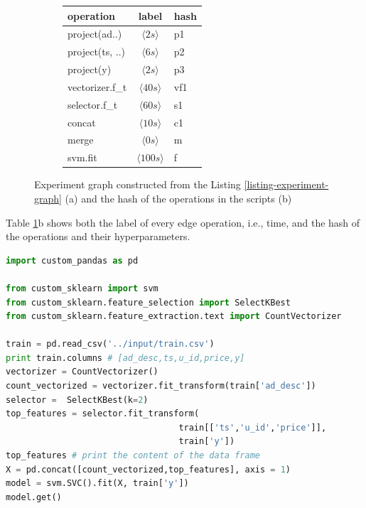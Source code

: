 \begin{figure}
\begin{subfigure}[b]{0.6\linewidth}
\begin{tabular}{lcl}
\hline
operation & label &  hash \\
\hline
project(ad..) & $\langle 2s\rangle$ &p1 \\
project(ts, ..) & $\langle 6s\rangle$ & p2\\
project(y) & $\langle 2s\rangle$ & p3\\
vectorizer.f\_t & $\langle 40s\rangle$ & vf1 \\
selector.f\_t & $\langle 60s\rangle$ & s1 \\
concat & $\langle 10s\rangle$ & c1 \\
merge & $\langle 0s\rangle$ & m\\
svm.fit & $\langle 100s\rangle$ & f\\
\hline
\end{tabular}
\caption{}
\end{subfigure}
\caption{Experiment graph constructed from the Listing \ref{listing-experiment-graph} (a) and the hash of the operations in the scripts (b)}
\label{fig-experiment-graph}
\end{figure}
Table \ref{fig-experiment-graph}b shows both the label of every edge operation, i.e., time, and the hash of the operations and their hyperparameters.

\begin{lstlisting}[language=Python, caption=Example script,captionpos=b,label = {listing-experiment-graph}]
import custom_pandas as pd

from custom_sklearn import svm
from custom_sklearn.feature_selection import SelectKBest
from custom_sklearn.feature_extraction.text import CountVectorizer

train = pd.read_csv('../input/train.csv') 
print train.columns # [ad_desc,ts,u_id,price,y]
vectorizer = CountVectorizer()
count_vectorized = vectorizer.fit_transform(train['ad_desc'])
selector =  SelectKBest(k=2)
top_features = selector.fit_transform(
                                  train[['ts','u_id','price']],  
                                  train['y'])
top_features # print the content of the data frame			     
X = pd.concat([count_vectorized,top_features], axis = 1)
model = svm.SVC().fit(X, train['y'])
model.get()
\end{lstlisting}

